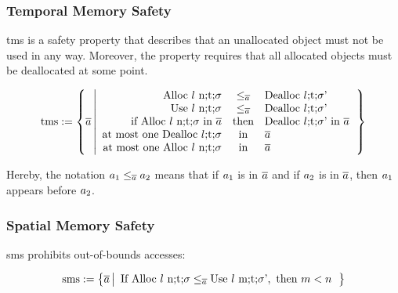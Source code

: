 \documentclass[utf8,acmsmall,review,screen,dvipsnames,anonymous]{acmart}
\begin{document}
\subsubsection{Temporal Memory Safety}

\gls*{tms} is a safety property that describes that an unallocated object must not be used in any way.
Moreover, the property requires that all allocated objects must be deallocated at some point.

\begin{definition}\label{def:trace:tmsdef}
  $$
  \tmssafe:=\left\{\trace \left| \begin{array}{rcl}
                              \ev{Alloc\ \loc\ n;\sandboxtag;\securitytag}&\le_{\trace}&\ev{Dealloc\ \loc;\sandboxtag;\securitytag'} \\
                              \ev{Use\ \loc\ n;\sandboxtag;\securitytag}&\le_{\trace}&\ev{Dealloc\ \loc;\sandboxtag;\securitytag'} \\
                              \text{if }\ev{Alloc\ \loc\ n;\sandboxtag;\securitytag}\text{ in }\trace&\text{then}&\ev{Dealloc\ \loc;\sandboxtag;\securitytag'}\text{ in }\trace \\
                              \text{at most one }\ev{Dealloc\ \loc;\sandboxtag;\securitytag}&\text{in}&\trace \\
                              \text{at most one }\ev{Alloc\ \loc\ n;\sandboxtag;\securitytag}&\text{in}&\trace \\
                            \end{array}\right.\right\}
  $$
\end{definition}
Hereby, the notation $\event[_{1}]\le_{\trace}\event[_{2}]$ means that if $\event[_{1}]$ is in $\trace$ and if $\event[_{2}]$ is in $\trace$, then $\event[_{1}]$ appears before $\event[_{2}]$.

\subsubsection{Spatial Memory Safety}

\gls*{sms} prohibits out-of-bounds accesses:

\begin{definition}\label{def:trace:smsdef}
  $$
  \smssafe:=\left\{\trace \left|\begin{array}{rcl}
                                  \text{If }\ev{Alloc\ \loc\ n;\sandboxtag;\securitytag}\le_{\trace}\ev{Use\ \loc\ m;\sandboxtag;\securitytag'}, \text{ then }m<n
                                \end{array}\right.\right\}
  $$
\end{definition}
\end{document}

